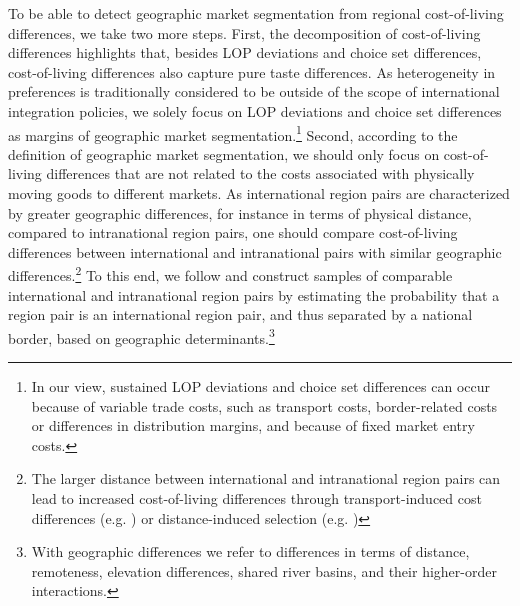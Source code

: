 To be able to detect geographic market segmentation from regional cost-of-living differences, we take two more steps. First, the decomposition of cost-of-living differences highlights that, besides LOP deviations and choice set differences, cost-of-living differences also capture pure taste differences. As heterogeneity in preferences is traditionally considered to be outside of the scope of international integration policies, we solely focus on LOP deviations and choice set differences as margins of geographic market segmentation.\footnote{In our view, sustained LOP deviations and choice set differences can occur because of variable trade costs, such as transport costs, border-related costs or differences in distribution margins, and because of fixed market entry costs.} Second, according to the definition of geographic market segmentation, we should only focus on cost-of-living differences that are not related to the costs associated with physically moving goods to different markets. As international region pairs are characterized by greater geographic differences, for instance in terms of physical distance, compared to intranational region pairs, one should compare cost-of-living differences between international and intranational pairs with similar geographic differences.\footnote{The larger distance between international and intranational region pairs can lead to increased cost-of-living differences through transport-induced cost differences (e.g. \citet{Donaldson2018}) or distance-induced selection (e.g. \citet{Hummels2004})} To this end, we follow \citet{Santamaria2021} and construct samples of comparable international and intranational region pairs by estimating the probability that a region pair is an international region pair, and thus separated by a national border, based on geographic determinants.\footnote{With geographic differences we refer to differences in terms of distance, remoteness, elevation differences, shared river basins, and their higher-order interactions.} 

